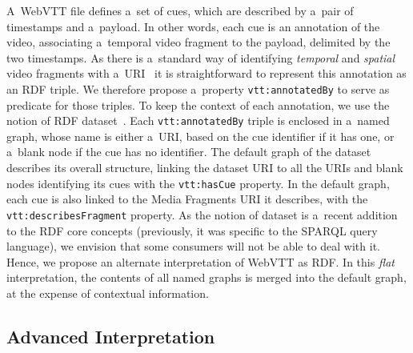 \documentclass{sig-alternate-ceur}
\newcommand{\vtt}[1]{\texttt{vtt:#1}}
\begin{document}
A~WebVTT file defines a~set of cues,
which are described by a~pair of timestamps and a~payload.
In other words, each cue is an annotation of the video,
associating a~temporal video fragment to the payload,
delimited by the two timestamps.
As there is a~standard way of identifying \emph{temporal}
and \emph{spatial} video fragments
with a~URI~\cite{troncy2012mediafragments}
it is straightforward to represent this annotation as an RDF triple.
We therefore propose a~property \vtt{annotatedBy}
to serve as predicate for those triples.
To keep the context of each annotation,
we use the notion of RDF dataset~\cite{cyganiak2014rdf11concepts}.
Each \vtt{annotatedBy} triple is enclosed in a~named graph,
whose name is either a~URI, based on the cue identifier if it has one,
or a~blank node if the cue has no identifier.
The default graph of the dataset describes its overall structure,
linking the dataset URI to all the URIs and blank nodes identifying its cues
with the \vtt{hasCue} property.
In the default graph, each cue is also linked to
the Media Fragments URI it describes,
with the \vtt{describesFragment} property. 
As the notion of dataset is a~recent addition to the RDF core concepts
(previously, it was specific to the SPARQL query language),
we envision that some consumers will not be able to deal with it.
Hence, we propose an alternate interpretation of WebVTT as RDF.
In this \emph{flat} interpretation,
the contents of all named graphs is merged into the default graph,
at the expense of contextual information.

\subsection{Advanced Interpretation}
\end{document}
